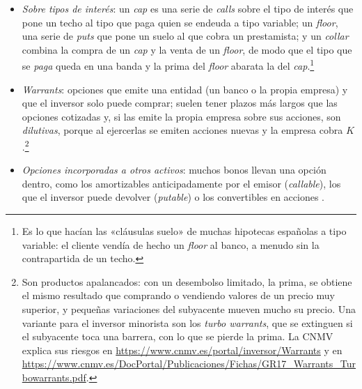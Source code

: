 \documentclass[11pt]{article}
\begin{document}
\begin{itemize}
\begin{itemize}
  \end{itemize}
\item \emph{Sobre tipos de interés}: un \emph{cap} es una serie de \emph{calls} sobre el tipo de interés que pone un techo al tipo que paga quien se endeuda a tipo variable; un \emph{floor}, una serie de \emph{puts} que pone un suelo al que cobra un prestamista; y un \emph{collar} combina la compra de un \emph{cap} y la venta de un \emph{floor}, de modo que el tipo que se \emph{paga} queda en una banda y la prima del \emph{floor} abarata la del \emph{cap}.\footnote{Es lo que hacían las «cláusulas suelo» de muchas hipotecas españolas a tipo variable: el cliente vendía de hecho un \emph{floor} al banco, a menudo sin la contrapartida de un techo.}
\item \emph{Warrants}: opciones que emite una entidad (un banco o la propia empresa) y que el inversor solo puede comprar; suelen tener plazos más largos que las opciones cotizadas y, si las emite la propia empresa sobre sus acciones, son \emph{dilutivas}, porque al ejercerlas se emiten acciones nuevas y la empresa cobra $K$\nocite{Hull2022Options} .\footnote{Son productos apalancados: con un desembolso limitado, la prima, se obtiene el mismo resultado que comprando o vendiendo valores de un precio muy superior, y pequeñas variaciones del subyacente mueven mucho su precio. Una variante para el inversor minorista son los \emph{turbo warrants}, que se extinguen si el subyacente toca una barrera, con lo que se pierde la prima. La CNMV explica sus riesgos en \url{https://www.cnmv.es/portal/inversor/Warrants} y en \url{https://www.cnmv.es/DocPortal/Publicaciones/Fichas/GR17_Warrants_Turbowarrants.pdf}.}
\item \emph{Opciones incorporadas a otros activos}: muchos bonos llevan una opción dentro, como los amortizables anticipadamente por el emisor (\emph{callable}), los que el inversor puede devolver (\emph{putable}) o los convertibles en acciones .
\end{itemize}
\end{document}
